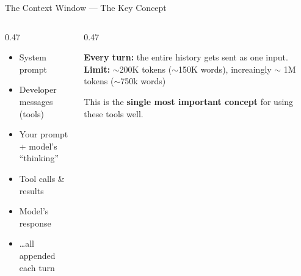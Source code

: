 \documentclass[aspectratio=169, 10pt]{beamer}
\begin{document}
\begin{frame}{The Context Window --- The Key Concept}
\begin{columns}[T]
\begin{column}{0.47\textwidth}
\begin{tcolorbox}[keybox, title={What the model ``sees''}]
\small
\begin{itemize}\setlength{\itemsep}{0pt}
  \item System prompt
  \item Developer messages (tools)
  \item Your prompt + model's ``thinking''
  \item Tool calls \& results
  \item Model's response
  \item \ldots all appended each turn
\end{itemize}
\end{tcolorbox}
\end{column}
\begin{column}{0.47\textwidth}
\begin{tcolorbox}[accentbox]
\small
\textbf{Every turn:} the entire history gets sent as one input.
\vskip4pt
\textbf{Limit:} $\sim$200K tokens ($\sim$150K words), increaingly $\sim$ 1M tokens ($\sim$750k words)
\end{tcolorbox}
\vskip4pt
\pause
\begin{tcolorbox}[colback=SoftCoral!8, colframe=SoftCoral, boxrule=0.5pt, left=5pt, right=5pt, top=3pt, bottom=3pt]
\centering\small
This is the \textbf{single most important concept} for using these tools well.
\end{tcolorbox}
\end{column}
\end{columns}
\end{frame}
\end{document}
